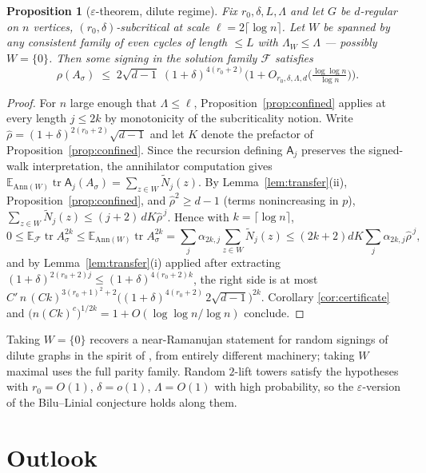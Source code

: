 \documentclass[11pt]{article}
\newtheorem{proposition}[lemma]{Proposition}
\theoremstyle{remark}
\DeclareMathOperator{\tr}{tr}
\begin{document}
\begin{proposition}[$\varepsilon$-theorem, dilute regime]\label{thm:eps}
Fix $r_0,\delta,L,\Lambda$ and let $G$ be $d$-regular on $n$
vertices, $(r_0,\delta)$-subcritical at scale
$\ell=2\lceil\log n\rceil$.
Let $W$ be spanned by any consistent family of even cycles of length
$\le L$ with $\Lambda_W\le\Lambda$ --- possibly $W=\{0\}$. Then some
signing in the solution family $\mathcal F$ satisfies
\[
\rho(A_\sigma)\;\le\;
2\sqrt{d-1}\;(1+\delta)^{4(r_0+2)}
\Big(1+O_{r_0,\delta,\Lambda,d}\big(\tfrac{\log\log n}{\log n}\big)\Big).
\]
\end{proposition}

\begin{proof}
For $n$ large enough that $\Lambda\le\ell$,
Proposition~\ref{prop:confined} applies at every length $j\le2k$ by
monotonicity of the subcriticality notion. Write
$\hat\rho=(1+\delta)^{2(r_0+2)}\sqrt{d-1}$ and let $K$ denote
the prefactor of Proposition~\ref{prop:confined}. Since the recursion
defining $\mathsf A_j$ preserves the signed-walk interpretation, the
annihilator computation gives
$\mathbb E_{\mathrm{Ann}(W)}\tr\mathsf A_j(A_\sigma)
=\sum_{z\in W}\widetilde N_j(z)$. By
Lemma~\ref{lem:transfer}(ii), Proposition~\ref{prop:confined}, and
$\hat\rho^2\ge d-1$ (terms nonincreasing in $p$),
$\sum_{z\in W}\widetilde N_j(z)\le(j+2)\,dK\hat\rho^{\,j}$. Hence with
$k=\lceil\log n\rceil$,
\[
0\le\mathbb E_{\mathcal F}\tr A_\sigma^{2k}
\le\mathbb E_{\mathrm{Ann}(W)}\tr A_\sigma^{2k}
=\sum_j\alpha_{2k,j}\sum_{z\in W}\widetilde N_j(z)
\le (2k+2)dK\sum_j\alpha_{2k,j}\hat\rho^{\,j},
\]
and by Lemma~\ref{lem:transfer}(i) applied after extracting
$(1+\delta)^{2(r_0+2)j}\le(1+\delta)^{4(r_0+2)k}$, the right side is at
most $C'\,n\,(Ck)^{3(r_0+1)^2+2}
\big((1+\delta)^{4(r_0+2)}\,2\sqrt{d-1}\big)^{2k}$. Corollary
\ref{cor:certificate} and $\big(n(Ck)^{c}\big)^{1/2k}
=1+O(\log\log n/\log n)$ conclude.
\end{proof}

Taking $W=\{0\}$ recovers a near-Ramanujan statement for random
signings of dilute graphs in the spirit of \cite{mop20}, from entirely
different machinery; taking $W$ maximal uses the full parity family.
Random $2$-lift towers satisfy the hypotheses with $r_0=O(1)$,
$\delta=o(1)$, $\Lambda=O(1)$ with high probability, so the
$\varepsilon$-version of the Bilu--Linial conjecture holds along them.

\section{Outlook}
\end{document}
